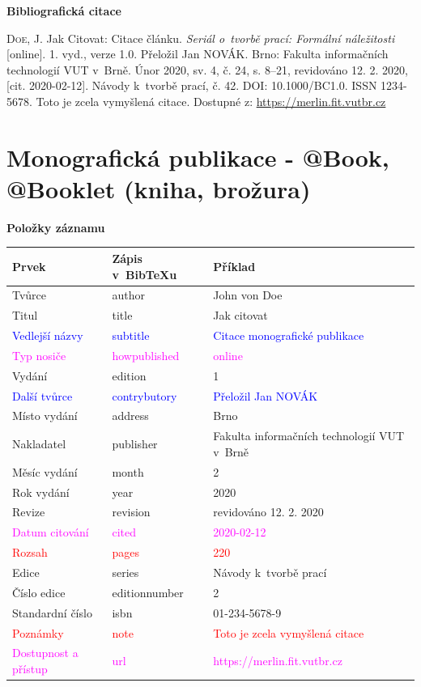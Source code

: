 \bigskip

\noindent \textbf{Bibliografická citace}

\medskip

\noindent \textsc{Doe}, J. Jak Citovat: Citace článku. \textit{Seriál o~tvorbě prací: Formální náležitosti} [online]. 1. vyd., verze 1.0. Přeložil Jan NOVÁK. Brno: Fakulta informačních technologií VUT v~Brně. Únor 2020, sv. 4, č. 24, s. 8–21, revidováno 12. 2. 2020, [cit. 2020-02-12]. Návody k~tvorbě prací, č. 42. DOI: 10.1000/BC1.0. ISSN 1234-5678. Toto je zcela vymyšlená citace. Dostupné z: \url{https://merlin.fit.vutbr.cz}

\newpage
\section*{Monografická publikace - @Book, @Booklet (kniha, brožura)}
\label{pr-monografie}
\noindent \textbf{Položky záznamu}

\medskip

\begin{tabularx}{\linewidth}{X X X}
    Prvek & Zápis v~BibTeXu & Příklad\\\hline
    Tvůrce & author & John von Doe\\
    Titul & title & Jak citovat\\
    \textcolor{blue}{Vedlejší názvy} & \textcolor{blue}{subtitle} & \textcolor{blue}{Citace monografické publikace}\\
    \textcolor{magenta}{Typ nosiče} & \textcolor{magenta}{howpublished} & \textcolor{magenta}{online}\\
    Vydání & edition & 1\\
    \textcolor{blue}{Další tvůrce} & \textcolor{blue}{contrybutory} & \textcolor{blue}{Přeložil Jan NOVÁK}\\
    Místo vydání & address & Brno\\
    Nakladatel & publisher & Fakulta informačních technologií VUT v~Brně\\
    Měsíc vydání & month & 2\\
    Rok vydání & year & 2020\\
    Revize & revision & revidováno 12. 2. 2020\\
    \textcolor{magenta}{Datum citování} & \textcolor{magenta}{cited} & \textcolor{magenta}{2020-02-12}\\
    \textcolor{red}{Rozsah} & \textcolor{red}{pages} & \textcolor{red}{220}\\
    Edice & series & Návody k~tvorbě prací\\
    Číslo edice & editionnumber & 2\\
    Standardní číslo & isbn & 01-234-5678-9\\
    \textcolor{red}{Poznámky} & \textcolor{red}{note} & \textcolor{red}{Toto je zcela vymyšlená citace}\\
    \textcolor{magenta}{Dostupnost a přístup} & \textcolor{magenta}{url} & \textcolor{magenta}{https://merlin.fit.vutbr.cz}\\
\end{tabularx}

